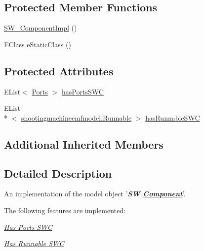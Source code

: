 \subsection*{Protected Member Functions}
\begin{DoxyCompactItemize}
\item 
\hyperlink{classshootingmachineemfmodel_1_1impl_1_1_s_w___component_impl_a93f7ce0be55ba0026d1ac4939fadaea3}{S\-W\-\_\-\-Component\-Impl} ()
\item 
E\-Class \hyperlink{classshootingmachineemfmodel_1_1impl_1_1_s_w___component_impl_a63156210e8dcb36161a20ac848ac3a99}{e\-Static\-Class} ()
\end{DoxyCompactItemize}
\subsection*{Protected Attributes}
\begin{DoxyCompactItemize}
\item 
E\-List$<$ \hyperlink{interfaceshootingmachineemfmodel_1_1_ports}{Ports} $>$ \hyperlink{classshootingmachineemfmodel_1_1impl_1_1_s_w___component_impl_ab662a79292869cbd21e936cb6b303251}{has\-Ports\-S\-W\-C}
\item 
E\-List\\*
$<$ \hyperlink{interfaceshootingmachineemfmodel_1_1_runnable}{shootingmachineemfmodel.\-Runnable} $>$ \hyperlink{classshootingmachineemfmodel_1_1impl_1_1_s_w___component_impl_ab13b9dcc9bf1f1edc9ab38ff710f81ed}{has\-Runnable\-S\-W\-C}
\end{DoxyCompactItemize}
\subsection*{Additional Inherited Members}


\subsection{Detailed Description}
An implementation of the model object '{\itshape {\bfseries S\-W \hyperlink{interfaceshootingmachineemfmodel_1_1_component}{Component}}}'.

The following features are implemented\-: 
\begin{DoxyItemize}
\item \hyperlink{classshootingmachineemfmodel_1_1impl_1_1_s_w___component_impl_a506d6529374f47b28cb78ec920852c3b}{{\itshape Has Ports S\-W\-C}} 
\item \hyperlink{classshootingmachineemfmodel_1_1impl_1_1_s_w___component_impl_afb6ead0797fbb25059fe4a7a507cfb3e}{{\itshape Has Runnable S\-W\-C}} 
\end{DoxyItemize}

